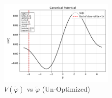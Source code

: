 \documentclass[aps,prd,reprint,preprintnumbers,showpacs,floatfix,nofootinbib,superscript address]{revtex4-2}
\begin{document}

\begin{figure}[h!]
    \centering
    \includegraphics[width=0.5\textwidth]{Python/Figures/AE/inflation_plots/potential.png}
    \caption{$V(\tilde{\varphi})$ vs $\tilde{\varphi}$ (Un-Optimized)}
    \label{Canonical Potential vs Field1}
\end{figure}
\end{document}

